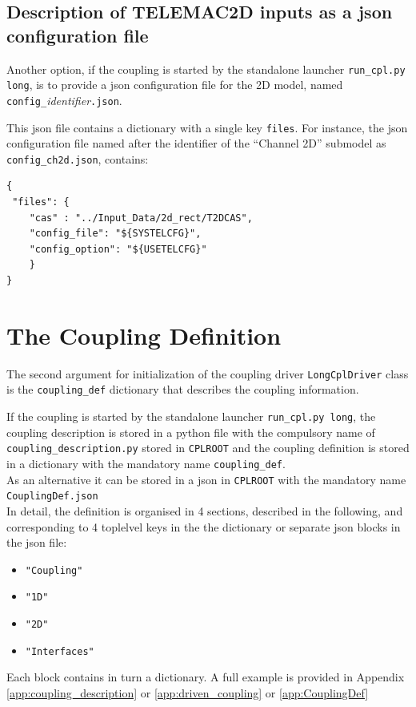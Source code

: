 \documentclass[Coupling]{../../data/TelemacDoc} %
\begin{document}
\subsection{Description of TELEMAC2D inputs as a json configuration file}
Another option, if the coupling is started by the standalone launcher
\texttt{run\_cpl.py long}, is to provide a json configuration file 
for the 2D model, named \\
\texttt{config\_}{\em identifier}\texttt{.json}.

This json file contains a dictionary with a single key \texttt{files}. For instance, the json configuration file named after the identifier of the ``Channel 2D'' submodel as \texttt{config\_ch2d.json}, contains:
\begin{verbatim}
{
 "files": {
    "cas" : "../Input_Data/2d_rect/T2DCAS",
    "config_file": "${SYSTELCFG}",
    "config_option": "${USETELCFG}"
    }
}
\end{verbatim}

\section{The Coupling Definition}\label{json:CouplingDef}
The second argument for initialization of the coupling driver
\texttt{LongCplDriver} class is the \texttt{coupling\_def} dictionary that describes the coupling information.

If the coupling is started by the standalone launcher
\texttt{run\_cpl.py long}, the coupling description is stored in
a python file with the compulsory name of \texttt{coupling\_description.py} stored in
\texttt{CPLROOT} and the coupling definition is stored in a
dictionary with the mandatory name \texttt{coupling\_def}.\\
As an alternative it can be stored in a json in
\texttt{CPLROOT} with the mandatory name\\
\texttt{CouplingDef.json}\\

In detail, the definition is organised in 4 sections, described in the following, and corresponding to
4 toplelvel keys in the the dictionary or separate json
blocks in the json file:
\begin{itemize}
\item\texttt{"Coupling"}
\item\texttt{"1D"}
\item\texttt{"2D"}
\item\texttt{"Interfaces"}
\end{itemize}
Each block contains in turn a dictionary.  A full example is provided in Appendix \ref{app:coupling_description}
or \ref{app:driven_coupling} or \ref{app:CouplingDef}
\end{document}
